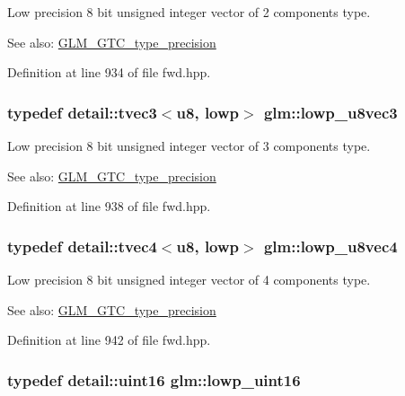 Low precision 8 bit unsigned integer vector of 2 components type. \begin{Desc}
\item[See also:]\hyperlink{group__gtc__type__precision}{GLM\_\-GTC\_\-type\_\-precision} \end{Desc}


Definition at line 934 of file fwd.hpp.\hypertarget{group__gtc__type__precision_gf0d7154052c636edf4a902fc8a4a56f2}{
\subsubsection[lowp\_\-u8vec3]{\setlength{\rightskip}{0pt plus 5cm}typedef detail::tvec3$<$u8, lowp$>$ {\bf glm::lowp\_\-u8vec3}}}
\label{group__gtc__type__precision_gf0d7154052c636edf4a902fc8a4a56f2}


Low precision 8 bit unsigned integer vector of 3 components type. \begin{Desc}
\item[See also:]\hyperlink{group__gtc__type__precision}{GLM\_\-GTC\_\-type\_\-precision} \end{Desc}


Definition at line 938 of file fwd.hpp.\hypertarget{group__gtc__type__precision_g98f82380862128fac9afae1b53840562}{
\subsubsection[lowp\_\-u8vec4]{\setlength{\rightskip}{0pt plus 5cm}typedef detail::tvec4$<$u8, lowp$>$ {\bf glm::lowp\_\-u8vec4}}}
\label{group__gtc__type__precision_g98f82380862128fac9afae1b53840562}


Low precision 8 bit unsigned integer vector of 4 components type. \begin{Desc}
\item[See also:]\hyperlink{group__gtc__type__precision}{GLM\_\-GTC\_\-type\_\-precision} \end{Desc}


Definition at line 942 of file fwd.hpp.\hypertarget{group__gtc__type__precision_g9b8409887319f62f06e664f6ca121b9d}{
\subsubsection[lowp\_\-uint16]{\setlength{\rightskip}{0pt plus 5cm}typedef detail::uint16 {\bf glm::lowp\_\-uint16}}}
\label{group__gtc__type__precision_g9b8409887319f62f06e664f6ca121b9d}


